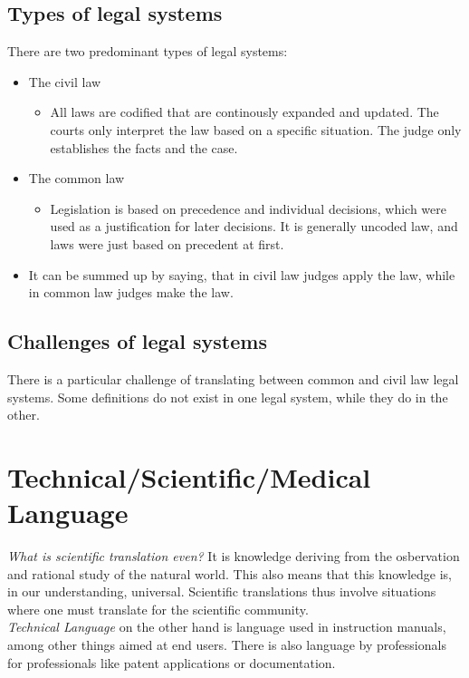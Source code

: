 \documentclass{article}
\begin{document}
	\subsection{Types of legal systems}
	There are two predominant types of legal systems:
	\begin{itemize}
		\item{The civil law}
		\begin{itemize}
			\item{All laws are codified that are continously expanded and updated. The courts only interpret the law based on a specific situation. The judge only establishes the facts and the case.}
		\end{itemize}
		\item{The common law}
		\begin{itemize}
			\item{Legislation is based on precedence and individual decisions, which were used as a justification for later decisions. It is generally uncoded law, and laws were just based on precedent at first.}
		\end{itemize}
		\item{It can be summed up by saying, that in civil law judges apply the law, while in common law judges make the law.}
	\end{itemize}
	\subsection{Challenges of legal systems}
	There is a particular challenge of translating between common and civil law legal systems. Some definitions do not exist in one legal system, while they do in the other.

	\section{Technical/Scientific/Medical Language}
	\textit{What is scientific translation even?} It is knowledge deriving from the osbervation and rational study of the natural world. This also means that this knowledge is, in our understanding, universal. Scientific translations thus involve situations where one must translate for the scientific community. \\
	\textit{Technical Language} on the other hand is language used in instruction manuals, among other things aimed at end users. There is also language by professionals for professionals like patent applications or documentation. \\
\end{document}
